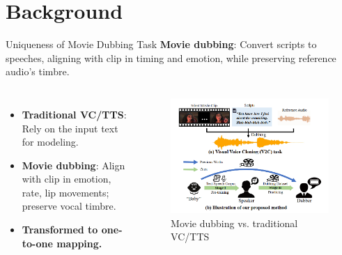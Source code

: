 

\section{Background}

\begin{frame}{Uniqueness of Movie Dubbing Task}
 \textbf{Movie dubbing}: Convert scripts to speeches, aligning with clip in timing and emotion, while preserving reference audio's timbre.\cite{zhang2024speaker}
    \begin{columns}[c]
        \begin{itemize}
            \item \textbf{Traditional VC/TTS}: Rely on the input text for modeling.
            \item \textbf{Movie dubbing}: Align with clip in emotion, rate, lip movements; preserve vocal timbre.
            \item \textbf{Transformed to one-to-one mapping.}
        \end{itemize}
        \begin{figure}
            \centering
            \includegraphics[width=\linewidth]{figs/difference.png}
            \caption{Movie dubbing vs. traditional VC/TTS}
            \label{fig:v2c_task}
        \end{figure}
    \end{columns}
\end{frame}


